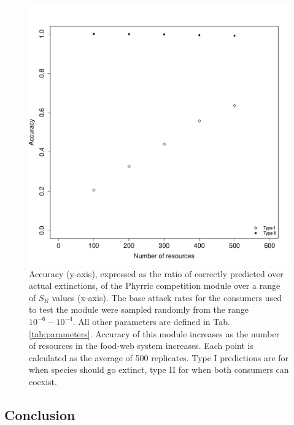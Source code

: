\documentclass[a4paper]{report}
\begin{document}
\begin{figure}[H]

\centering{}
\includegraphics[scale=0.5]{../Images/Validation_phyrric.pdf}
  \caption{Accuracy (y-axis), expressed as the ratio of correctly predicted over actual extinctions, of the Phyrric competition module over a range of $S_R$ values (x-axis). The base attack rates for the consumers used to test the module were sampled randomly from the range $10^{-6}-10^{-4}$. All other parameters are defined in Tab. \ref{tab:parameters}. Accuracy of this module increases as the number of resources in the food-web system increases. Each point is calculated as the average of 500 replicates. Type I predictions are for when species should go extinct, type II for when both consumers can coexist.\label{fig:Validation_phyrric}}
\end{figure}


\subsection{Conclusion}
\end{document}

